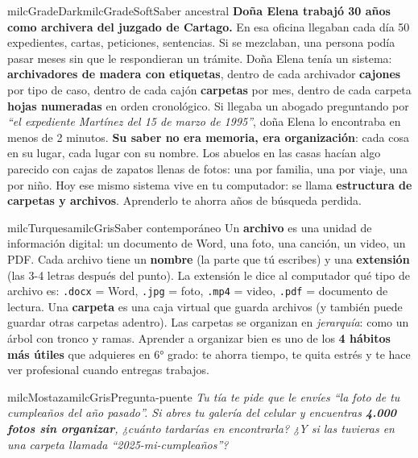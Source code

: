 \documentclass[11pt,letterpaper]{article}
\begin{document}
\begin{softbox}{milcGradeDark}{milcGradeSoft}{Saber ancestral}
\textbf{Doña Elena trabajó 30 años como archivera del juzgado de Cartago.} En esa oficina llegaban cada día 50 expedientes, cartas, peticiones, sentencias. Si se mezclaban, una persona podía pasar meses sin que le respondieran un trámite. Doña Elena tenía un sistema: \textbf{archivadores de madera con etiquetas}, dentro de cada archivador \textbf{cajones} por tipo de caso, dentro de cada cajón \textbf{carpetas} por mes, dentro de cada carpeta \textbf{hojas numeradas} en orden cronológico. Si llegaba un abogado preguntando por \emph{``el expediente Martínez del 15 de marzo de 1995''}, doña Elena lo encontraba en menos de 2 minutos. \textbf{Su saber no era memoria, era organización}: cada cosa en su lugar, cada lugar con su nombre. Los abuelos en las casas hacían algo parecido con cajas de zapatos llenas de fotos: una por familia, una por viaje, una por niño. Hoy ese mismo sistema vive en tu computador: se llama \textbf{estructura de carpetas y archivos}. Aprenderlo te ahorra años de búsqueda perdida.
\end{softbox}

\begin{softbox}{milcTurquesa}{milcGris}{Saber contemporáneo}
Un \textbf{archivo} es una unidad de información digital: un documento de Word, una foto, una canción, un video, un PDF. Cada archivo tiene un \textbf{nombre} (la parte que tú escribes) y una \textbf{extensión} (las 3-4 letras después del punto). La extensión le dice al computador qué tipo de archivo es: \texttt{.docx} = Word, \texttt{.jpg} = foto, \texttt{.mp4} = video, \texttt{.pdf} = documento de lectura. Una \textbf{carpeta} es una caja virtual que guarda archivos (y también puede guardar otras carpetas adentro). Las carpetas se organizan en \emph{jerarquía}: como un árbol con tronco y ramas. Aprender a organizar bien es uno de los \textbf{4 hábitos más útiles} que adquieres en 6° grado: te ahorra tiempo, te quita estrés y te hace ver profesional cuando entregas trabajos.
\end{softbox}

\begin{softbox}{milcMostaza}{milcGris}{Pregunta-puente}
\textit{Tu tía te pide que le envíes \emph{``la foto de tu cumpleaños del año pasado''}. Si abres tu galería del celular y encuentras \textbf{4.000 fotos sin organizar}, ¿cuánto tardarías en encontrarla? ¿Y si las tuvieras en una carpeta llamada \emph{``2025-mi-cumpleaños''}?}
\end{softbox}
\end{document}
